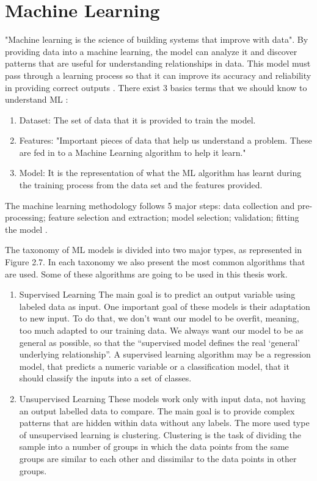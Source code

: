 \section{Machine Learning} 
\label{sub:if_you_use_this_template} 

"Machine learning is the science of building systems that improve with data"\cite{FCT_AA}. By providing data into a machine learning, the model can analyze it and discover patterns that are useful for understanding relationships in data. This model must pass through a learning process so that it can improve its accuracy and reliability in providing correct outputs \cite{OLD_15_WIND} \cite{46_ML}. There exist 3 basics terms that we should know to understand ML \cite{46_ML}:
\begin{enumerate}
    \item{Dataset:}
The set of data that it is provided to train the model.
    \item{Features:}
"Important pieces of data that help us understand a problem. These are fed in to a Machine Learning algorithm to help it learn."
    \item{Model:}
It is the representation of what the ML algorithm has learnt during the training process from the data set and the features provided.
\end{enumerate}

The machine learning methodology follows 5 major steps: data collection and pre-processing; feature selection and extraction; model selection; validation; fitting the model \cite{OLD_15_WIND} \cite{46_ML}.


The taxonomy of ML models is divided into two major types, as represented in Figure 2.7. In each taxonomy we also present the most common algorithms that are used. Some of these algorithms are going to be used in this thesis work.

\begin{enumerate}
    \item{Supervised Learning}
The main goal is to predict an output variable using labeled data as input. One important goal of these models is their adaptation to new input. To do that, we don’t want our model to be overfit, meaning, too much adapted to our training data. We always want our model to be as general as possible, so that the “supervised model defines the real ‘general’ underlying relationship”. A supervised learning algorithm may be a regression model, that predicts a numeric variable or a classification model, that it should classify the inputs into a set of classes.

    \item{Unsupervised Learning}
These models work only with input data, not having an output labelled data to compare. The main goal is to provide complex patterns that are hidden within data without any labels. The more used type of unsupervised learning is clustering. Clustering is the task of dividing the sample into a number of groups in which the data points from the same groups are similar to each other and dissimilar to the data points in other groups.
\end{enumerate}

